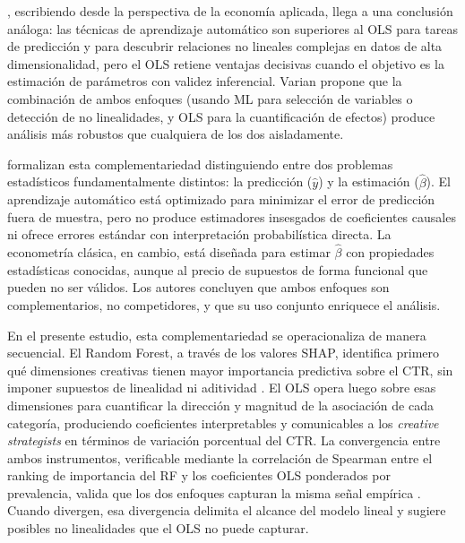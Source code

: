 \documentclass[12pt, a4paper]{report}
\begin{document}
\citet{varian2014}, escribiendo desde la perspectiva de la economía aplicada, llega a una
conclusión análoga: las técnicas de aprendizaje automático son superiores al OLS para tareas
de predicción y para descubrir relaciones no lineales complejas en datos de alta dimensionalidad,
pero el OLS retiene ventajas decisivas cuando el objetivo es la estimación de parámetros con
validez inferencial. Varian propone que la combinación de ambos enfoques (usando ML para
selección de variables o detección de no linealidades, y OLS para la cuantificación de efectos)
produce análisis más robustos que cualquiera de los dos aisladamente.

\citet{mullainathan2017} formalizan esta complementariedad distinguiendo entre dos problemas
estadísticos fundamentalmente distintos: la predicción ($\hat{y}$) y la estimación ($\hat{\beta}$).
El aprendizaje automático está optimizado para minimizar el error de predicción fuera de muestra,
pero no produce estimadores insesgados de coeficientes causales ni ofrece errores estándar con
interpretación probabilística directa. La econometría clásica, en cambio, está diseñada para
estimar $\hat{\beta}$ con propiedades estadísticas conocidas, aunque al precio de supuestos de
forma funcional que pueden no ser válidos. Los autores concluyen que ambos enfoques son
complementarios, no competidores, y que su uso conjunto enriquece el análisis.

En el presente estudio, esta complementariedad se operacionaliza de manera secuencial.
El Random Forest, a través de los valores SHAP, identifica primero qué dimensiones
creativas tienen mayor importancia predictiva sobre el CTR, sin imponer supuestos de
linealidad ni aditividad \citep{mullainathan2017}. El OLS opera luego sobre esas
dimensiones para cuantificar la dirección y magnitud de la asociación de cada categoría,
produciendo coeficientes interpretables y comunicables a los \textit{creative strategists}
en términos de variación porcentual del CTR. La convergencia entre ambos instrumentos,
verificable mediante la correlación de Spearman entre el ranking de importancia del RF
y los coeficientes OLS ponderados por prevalencia, valida que los dos enfoques capturan
la misma señal empírica \citep{breiman2001b}. Cuando divergen, esa divergencia delimita
el alcance del modelo lineal y sugiere posibles no linealidades que el OLS no puede capturar.

\end{document}
